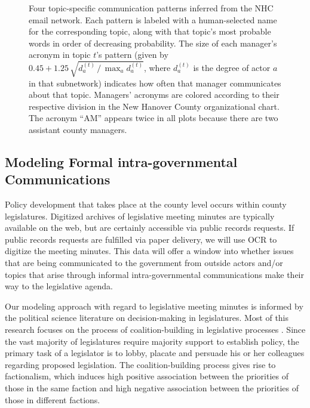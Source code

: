 \begin{figure}[t]
\begin{minipage}{0.5\linewidth}
\end{minipage}
\caption{Four topic-specific communication patterns inferred from the
  NHC email network. Each pattern is labeled with a human-selected
  name for the corresponding topic, along with that topic's most
  probable words in order of decreasing probability. The size of each
  manager's acronym in topic $t$'s pattern (given by $0.45 +
  1.25\,\sqrt{d^{(t)}_a \,/\, \max_a d^{(t)}_a}$, where $d^{(t)}_a$ is
  the degree of actor $a$ in that subnetwork) indicates how often that
  manager communicates about that topic.  Managers' acronyms are
  colored according to their respective division in the New
  Hanover County organizational chart. The acronym ``AM'' appears
  twice in all plots because there are two assistant county managers.}
\label{Figure:LatentSpace}
\end{figure}

\subsection{Modeling Formal intra-governmental Communications}

Policy development that takes place at the county level occurs within county legislatures. Digitized archives of legislative meeting minutes are typically available on the web, but are certainly accessible via public records requests. If public records requests are fulfilled via paper delivery, we will use OCR to digitize the meeting minutes. This data will offer a window into whether issues that are being communicated to the government from outside actors and/or topics that arise through informal intra-governmental communications make their way to the legislative agenda. 

Our modeling approach with regard to legislative meeting minutes is informed by the political science literature on decision-making in legislatures. Most of this research focuses on the process of coalition-building in legislative processes \cite{Aldrich1995}. Since the vast majority of legislatures require majority support to establish policy, the primary task of a legislator is to lobby, placate and persuade his or her colleagues regarding proposed legislation. The coalition-building process gives rise to factionalism, which induces high positive association between the priorities of those in the same faction and high negative association between the priorities of those in different factions. 

